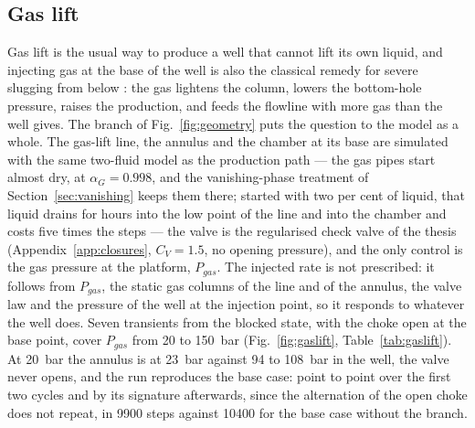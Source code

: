 \documentclass[a4paper,fleqn]{cas-sc}
\newcommand{\aG}{\alpha_G}
\begin{document}
\begin{table}[htbp]
\caption{Mesh dependence of the cycle with the choke open.}\label{tab:mesh}
\footnotesize


\end{table}

\subsection{Gas lift}\label{sec:gaslift}

Gas lift is the usual way to produce a well that cannot lift its own liquid, and injecting gas at the base of the well is also the classical remedy for severe slugging from below \citep{jansen1996}: the gas lightens the column, lowers the bottom-hole pressure, raises the production, and feeds the flowline with more gas than the well gives. The branch of Fig.~\ref{fig:geometry} puts the question to the model as a whole. The gas-lift line, the annulus and the chamber at its base are simulated with the same two-fluid model as the production path --- the gas pipes start almost dry, at $\aG = 0.998$, and the vanishing-phase treatment of Section~\ref{sec:vanishing} keeps them there; started with two per cent of liquid, that liquid drains for hours into the low point of the line and into the chamber and costs five times the steps --- the valve is the regularised check valve of the thesis (Appendix~\ref{app:closures}, $C_V = 1.5$, no opening pressure), and the only control is the gas pressure at the platform, $P_{gas}$. The injected rate is not prescribed: it follows from $P_{gas}$, the static gas columns of the line and of the annulus, the valve law and the pressure of the well at the injection point, so it responds to whatever the well does. Seven transients from the blocked state, with the choke open at the base point, cover $P_{gas}$ from 20 to \SI{150}{\bar} (Fig.~\ref{fig:gaslift}, Table~\ref{tab:gaslift}). At \SI{20}{\bar} the annulus is at \SI{23}{\bar} against 94 to \SI{108}{\bar} in the well, the valve never opens, and the run reproduces the base case: point to point over the first two cycles and by its signature afterwards, since the alternation of the open choke does not repeat, in \num{9900} steps against \num{10400} for the base case without the branch.
\end{document}
